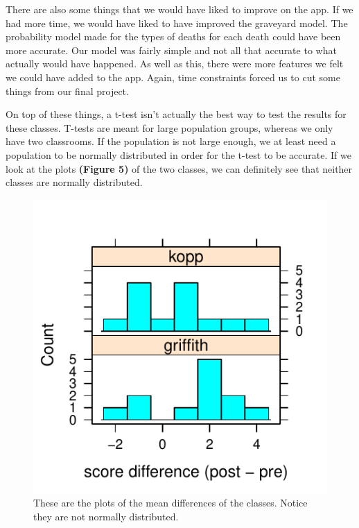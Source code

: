 \documentclass[titlepage]{article}\usepackage[]{graphicx}\usepackage[]{color}
\makeatletter
\def\maxwidth{ %
  \ifdim\Gin@nat@width>\linewidth
    \linewidth
  \else
    \Gin@nat@width
  \fi
}
\newenvironment{knitrout}{}{} %
\makeatother
\begin{document}
There are also some things that we would have liked to improve on the app. If we had more time, we would have liked to have improved the graveyard model. The probability model made for the types of deaths for each death could have been more accurate. Our model was fairly simple and not all that accurate to what actually would have happened. As well as this, there were more features we felt we could have added to the app. Again, time constraints forced us to cut some things from our final project. 

On top of these things, a t-test isn't actually the best way to test the results for these classes. T-tests are meant for large population groups, whereas we only have two classrooms. If the population is not large enough, we at least need a population to be normally distributed in order for the t-test to be accurate. If we look at the plots \textbf{(Figure 5)} of the two classes, we can definitely see that neither classes are normally distributed. 

\begin{figure}
\begin{knitrout}
\color{fgcolor}

{\centering \includegraphics[width=\maxwidth]{figure/unnamed-chunk-10-1} 

}



\end{knitrout}
\caption{These are the plots of the mean differences of the classes. Notice they are not normally distributed.}
\end{figure}
\end{document}
